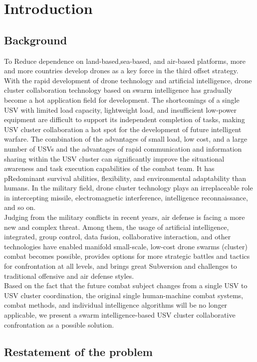 \documentclass{mcmthesis}
\begin{document}
\section{Introduction}
\subsection{Background}
To Reduce dependence on land-based,sea-based, and air-based platforms, more and more countries develop drones as a key force in the third offset strategy. With the rapid development of drone technology and artificial intelligence, drone cluster collaboration technology based on swarm intelligence has gradually become a hot application field for development. The shortcomings of a single USV with limited load capacity, lightweight load, and insufficient low-power equipment are difficult to support its independent completion of tasks, making USV cluster collaboration a hot spot for the development of future intelligent warfare. The combination of the advantages of small load, low cost, and a large number of USVs and the advantages of rapid communication and information sharing within the USV cluster can significantly improve the situational awareness and task execution capabilities of the combat team. It has pRedominant survival abilities, flexibility, and environmental adaptability than humans. In the military field, drone cluster technology plays an irreplaceable role in intercepting missile, electromagnetic interference, intelligence reconnaissance, and so on.\\
Judging from the military conflicts in recent years, air defense is facing a more new and complex threat. Among them, the usage of artificial intelligence, integrated, group control, data fusion, collaborative interaction, and other technologies have enabled manifold small-scale, low-cost drone swarms (cluster) combat becomes possible, provides options for more strategic battles and tactics for confrontation at all levels, and brings great Subversion and challenges to traditional offensive and air defense styles.\\
Based on the fact that the future combat subject changes from a single USV to USV cluster coordination, the original single human-machine combat systems, combat methods, and individual intelligence algorithms will be no longer applicable, we present a swarm intelligence-based USV cluster collaborative confrontation as a possible solution.

\subsection{Restatement of the problem}
\end{document}
